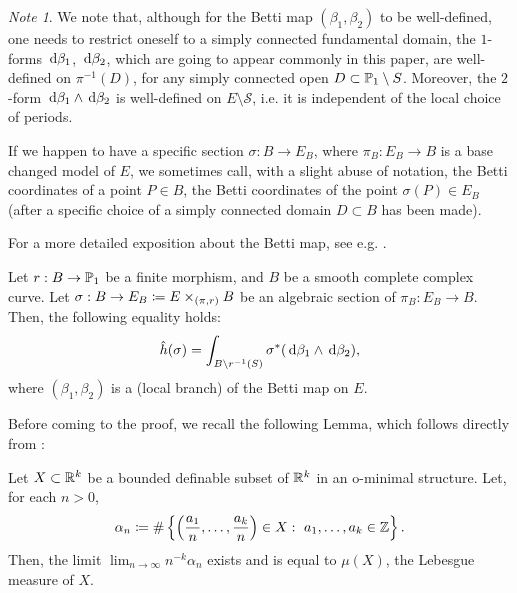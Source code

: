 \documentclass[a4paper,12pt]{article}
\theoremstyle{remark}
\newtheorem{note}[results]{Note}
\begin{document}
\begin{note}
	We note that, although for the Betti map $(\beta_1,\beta_2)$ to be well-defined, one needs to restrict oneself to a simply connected fundamental domain, the $1$-forms $\de \beta_1$, $\de \beta_2$, which are going to appear commonly in this paper, are well-defined on $\pi^{-1}(D)$, for any simply connected open $D \subset \P_1 \setminus S$. Moreover, the $2$-form $\de \beta_1 \wedge \de \beta_2$ is well-defined on $E \setminus \mathcal{S}$, i.e. it is independent of the local choice of periods.
\end{note}

If we happen to have a specific section $\sigma:B \rightarrow E_B$, where $\pi_B:E_B \rightarrow B$ is a base changed model of $E$, we sometimes call, with a slight abuse of notation, the Betti coordinates of a point $P \in B$, the Betti coordinates of the point $\sigma(P) \in E_B$ (after a specific choice of a simply connected domain $D \subset B$ has been made).
 
For a more detailed exposition about the Betti map, see e.g. \cite[Section 1.1]{bettitorsion}.
\begin{theorem}\label{Prop:equality}
	Let $r:B \rightarrow \P_1$ be a finite morphism, and $B$ be a smooth complete complex curve. Let $\sigma:B \rightarrow E_B \defeq E\times_{(\pi,r)}B$ be an algebraic section of $\pi_B:E_B \rightarrow B$.  Then, the following equality holds:
	\begin{equation}\label{soughtequality}
	\hat{h}(\sigma) = \int_{B \setminus r^{-1}(S)} \sigma^*(\de \beta_1 \wedge \de \beta_2),
	\end{equation}
	where $(\beta_1,\beta_2)$ is a (local branch) of the Betti map on $E$. 
\end{theorem}

Before coming to the proof, we recall the following Lemma, which follows directly from \cite[Theorem 1.3]{ominimal}:
\begin{lemma}\label{ominimalmeasure}
	Let $X \subset \R^k$ be a bounded definable subset of $\R^k$ in an o-minimal structure. Let, for each $n>0$,
	\[
	\alpha_n \defeq \#\left\{\left(\frac{a_1}{n},\dots,\frac{a_k}{n} \right)\in X: \ a_1,\dots, a_k \in \Z \right\}.
	\]
	Then, the limit $\lim_{n \to \infty} n^{-k}\alpha_n$ exists and is equal to $\mu(X)$, the Lebesgue measure of $X$.
\end{lemma}
\end{document}
